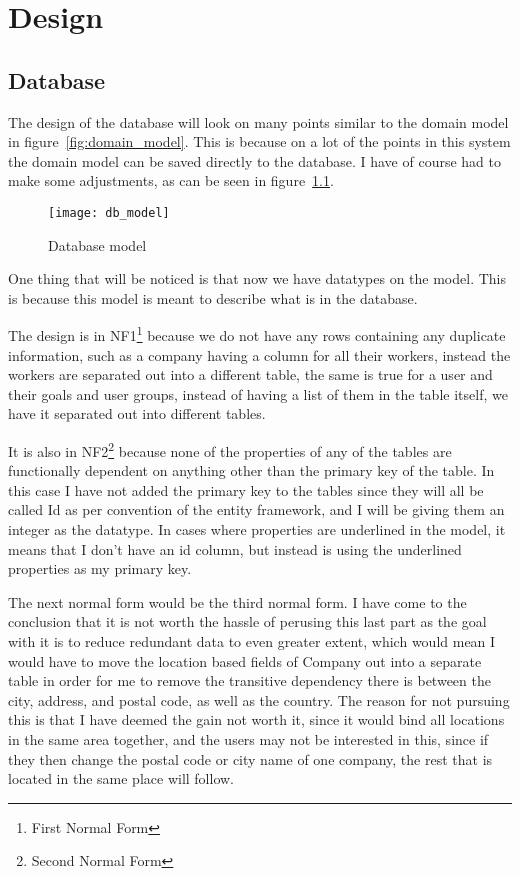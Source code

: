\chapter{Design}
\label{chap:Design}

\section{Database}
\label{sec:Database}
The design of the database will look on many points similar to the domain model in figure~\ref{fig:domain_model}. This is because on a lot of the points in this system the domain model can be saved directly to the database. I have of course had to make some adjustments, as can be seen in figure~\ref{fig:Database model}.

\begin{figure}
  \texttt{[image: db\_model]}
  \caption{Database model}
  \label{fig:Database model}
\end{figure}

One thing that will be noticed is that now we have datatypes on the model. This is because this model is meant to describe what is in the database.

The design is in NF1\footnote{First Normal Form} because we do not have any rows containing any duplicate information, such as a company having a column for all their workers, instead the workers are separated out into a different table\cite[p.~430]{DB_systems}, the same is true for a user and their goals and user groups, instead of having a list of them in the table itself, we have it separated out into different tables.

It is also in NF2\footnote{Second Normal Form} because none of the properties of any of the tables are functionally dependent on anything other than the primary key of the table\cite[p.~434]{DB_systems}. In this case I have not added the primary key to the tables since they will all be called Id as per convention of the entity framework, and I will be giving them an integer as the datatype. In cases where properties are underlined in the model, it means that I don't have an id column, but instead is using the underlined properties as my primary key.

The next normal form would be the third normal form. I have come to the conclusion that it is not worth the hassle of perusing this last part as the goal with it is to reduce redundant data to even greater extent, which would mean I would have to move the location based fields of Company out into a separate table in order for me to remove the transitive dependency\cite[p.~436]{DB_systems} there is between the city, address, and postal code, as well as the country. The reason for not pursuing this is that I have deemed the gain not worth it, since it would bind all locations in the same area together, and the users may not be interested in this, since if they then change the postal code or city name of one company, the rest that is located in the same place will follow.

